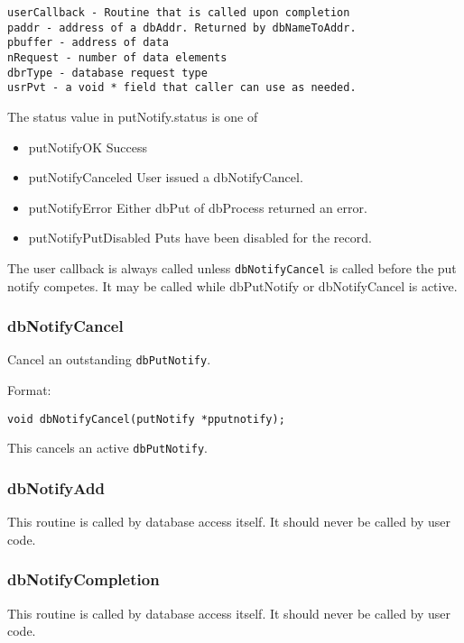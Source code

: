 \begin{verbatim}userCallback - Routine that is called upon completion
paddr - address of a dbAddr. Returned by dbNameToAddr.
pbuffer - address of data
nRequest - number of data elements
dbrType - database request type
usrPvt - a void * field that caller can use as needed.
\end{verbatim}The status value in putNotify.status is one of

\begin{itemize}\item  {}putNotifyOK Success

\item {}putNotifyCanceled User issued a dbNotifyCancel.

\item putNotifyError Either dbPut of dbProcess returned an error.

\item putNotifyPutDisabled Puts have been disabled for the record.

\end{itemize}The user callback is always called unless \verb|dbNotifyCancel| is called before the put notify competes. It may be called 
while dbPutNotify or dbNotifyCancel is active.

\subsubsection{dbNotifyCancel}

Cancel an outstanding \verb|dbPutNotify|.

Format:

\begin{verbatim}void dbNotifyCancel(putNotify *pputnotify);
\end{verbatim}This cancels an active \verb|dbPutNotify|.

\subsubsection{dbNotifyAdd}

This routine is called by database access itself. It should never be called by user code.

\subsubsection{dbNotifyCompletion}

This routine is called by database access itself. It should never be called by user code.

